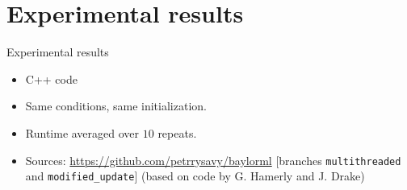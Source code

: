 \documentclass[10pt, compress]{beamer}
\newcommand{\x}{\vec{x}}
\newcommand{\ci}{\vec{c}_i}
\newcommand{\ux}{u(\x)}
\newcommand{\lux}{lu(\x)}
\newcommand{\mci}{m(\ci)}
\begin{document}

%

\section{Experimental results}

\begin{frame}{Experimental results}
  \begin{itemize}
    \item C++ code
    \item Same conditions, same initialization.
    \item Runtime averaged over $10$ repeats.
    \item Sources: \url{https://github.com/petrrysavy/baylorml} [branches \texttt{multithreaded} and \texttt{modified\_update}] (based on code by G. Hamerly and J. Drake)
  \end{itemize}
\end{frame}
\end{document}
